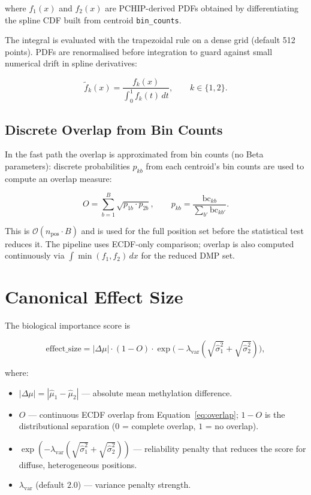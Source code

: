 \documentclass[11pt]{article}
\begin{document}
where \(f_1(x)\) and \(f_2(x)\) are PCHIP-derived PDFs obtained by
differentiating the spline CDF built from centroid \texttt{bin\_counts}.

The integral is evaluated with the trapezoidal rule on a dense grid
(default 512 points).  PDFs are renormalised before integration to guard
against small numerical drift in spline derivatives:

\begin{equation}
  \tilde{f}_k(x) = \frac{f_k(x)}
    {\displaystyle\int_0^1 f_k(t)\,dt}, \qquad k \in \{1,2\}.
\end{equation}

\subsection{Discrete Overlap from Bin Counts}

In the fast path the overlap is approximated from bin counts (no Beta
parameters): discrete probabilities \(p_{kb}\) from each centroid's bin counts
are used to compute an overlap measure:

\begin{equation}
  O = \sum_{b=1}^{B} \sqrt{p_{1b}\cdot p_{2b}},
  \qquad p_{kb} = \frac{\mathrm{bc}_{kb}}{\sum_{b'}\mathrm{bc}_{kb'}}.
\end{equation}

This is \(\mathcal{O}(n_\mathrm{pos} \cdot B)\) and is used for the full
position set before the statistical test reduces it. The pipeline uses
ECDF-only comparison; overlap is also computed continuously via
\(\int \min(f_1, f_2)\,dx\) for the reduced DMP set.

\section{Canonical Effect Size}
\label{sec:effectsize}

The biological importance score is

\begin{equation}
  \boxed{
    \mathrm{effect\_size}
    = |\Delta\mu|
      \cdot (1 - O)
      \cdot \exp\!\bigl(-\lambda_\mathrm{var}
            (\sqrt{\hat\sigma_1^2} + \sqrt{\hat\sigma_2^2})\bigr),
  }
  \label{eq:effectsize}
\end{equation}

where:
\begin{itemize}
  \item \(|\Delta\mu| = |\hat\mu_1 - \hat\mu_2|\) --- absolute mean
        methylation difference.
  \item \(O\) --- continuous ECDF overlap from
        Equation~\eqref{eq:overlap}; \(1 - O\) is the distributional
        separation (\(0\) = complete overlap, \(1\) = no overlap).
  \item \(\exp(-\lambda_\mathrm{var}(\sqrt{\hat\sigma_1^2}+\sqrt{\hat\sigma_2^2}))\)
        --- reliability penalty that reduces the score for diffuse,
        heterogeneous positions.
  \item \(\lambda_\mathrm{var}\) (default \(2.0\)) --- variance penalty
        strength.
\end{itemize}
\end{document}
